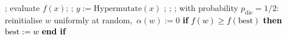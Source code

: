 \documentclass[lettersize,journal]{IEEEtran}
\newcommand{\rev}[1]{\textcolor{black}{#1}}
\begin{document}
 	
\begin{algorithm}[t] 
 	    \caption{$(1+1)$~Opt-IA$_{\textsc{LastBest}}$ }
     \begin{algorithmic}[1]  ;      
 	           \STATE evaluate $f(x)$;    
 	             ;
\STATE $y:=\text{Hypermutate}(x)$
 	            ;
 	            \ELSE
 	            ;
 	            \ENDIF
 	            ;
 	           \ENDIF
{}
 	            \STATE with probability $p_{\text{die}}=1/2$:
 	            \STATE \hspace{\algorithmicindent}
 	            reinitialise $w$ uniformly at random,\ $\alpha(w):=0$
 	            \textcolor{black}{\STATE \hspace{\algorithmicindent}
 	            	\textbf{if} $f(w) \geq f(\text{best})$ \textbf{then}
 	            	\STATE \hspace{2\algorithmicindent}
 	            	$\text{best}:=w$
 	            	\STATE \hspace{\algorithmicindent}
 	            	\textbf{end if}}
 	            \ENDIF
 	            \ENDFOR
 	         \rev{   
 	            \ENDIF}
\ENDWHILE
 	   \end{algorithmic} \label{alg:alg1+ageing}
 	\end{algorithm}
\end{document}
